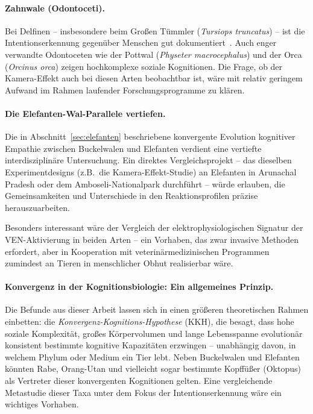 ﻿\documentclass[12pt,a4paper]{article}
\theoremstyle{definition}
\theoremstyle{remark}
\begin{document}
\paragraph{Zahnwale (Odontoceti).}
Bei Delfinen -- insbesondere beim Großen Tümmler (\textit{Tursiops truncatus}) -- ist die Intentionserkennung gegenüber Menschen gut dokumentiert~\cite{miklosi2004dogs}. Auch enger verwandte Odontoceten wie der Pottwal (\textit{Physeter macrocephalus}) und der Orca (\textit{Orcinus orca}) zeigen hochkomplexe soziale Kognitionen. Die Frage, ob der Kamera-Effekt auch bei diesen Arten beobachtbar ist, wäre mit relativ geringem Aufwand im Rahmen laufender Forschungsprogramme zu klären.

\paragraph{Die Elefanten-Wal-Parallele vertiefen.}
Die in Abschnitt~\ref{sec:elefanten} beschriebene konvergente Evolution kognitiver Empathie zwischen Buckelwalen und Elefanten verdient eine vertiefte interdisziplinäre Untersuchung. Ein direktes Vergleichsprojekt -- das dieselben Experimentdesigns (z.B.\ die Kamera-Effekt-Studie) an Elefanten in Arunachal Pradesh oder dem Amboseli-Nationalpark durchführt -- würde erlauben, die Gemeinsamkeiten und Unterschiede in den Reaktionsprofilen präzise herauszuarbeiten.

Besonders interessant wäre der Vergleich der elektrophysiologischen Signatur der VEN-Aktivierung in beiden Arten -- ein Vorhaben, das zwar invasive Methoden erfordert, aber in Kooperation mit veterinärmedizinischen Programmen zumindest an Tieren in menschlicher Obhut realisierbar wäre.

\paragraph{Konvergenz in der Kognitionsbiologie: Ein allgemeines Prinzip.}
Die Befunde aus dieser Arbeit lassen sich in einen größeren theoretischen Rahmen einbetten: die \emph{Konvergenz-Kognitions-Hypothese} (KKH), die besagt, dass hohe soziale Komplexität, großes Körpervolumen und lange Lebensspanne evolutionär konsistent bestimmte kognitive Kapazitäten erzwingen -- unabhängig davon, in welchem Phylum oder Medium ein Tier lebt. Neben Buckelwalen und Elefanten könnten Rabe, Orang-Utan und vielleicht sogar bestimmte Kopffüßer (Oktopus) als Vertreter dieser konvergenten Kognitionen gelten. Eine vergleichende Metastudie dieser Taxa unter dem Fokus der Intentionserkennung wäre ein wichtiges Vorhaben.
\end{document}
